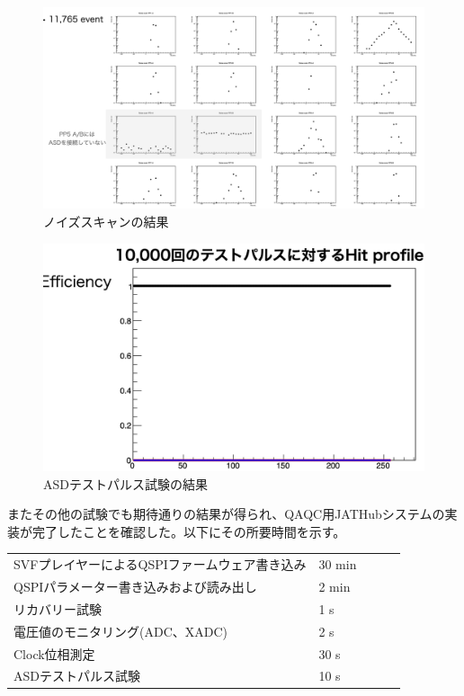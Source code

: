 \begin{figure} 
\centering
\includegraphics[width=16cm]{fig/QAQC/QAQCnoisescan.png}
\caption[ノイズスキャン]{ノイズスキャンの結果}
\label{QAQCnoisescan}
\end{figure}

\begin{figure} 
\centering
\includegraphics[width=16cm]{fig/QAQC/QAQCresult.png}
\caption[ASDテストパルスの結果]{ASDテストパルス試験の結果}
\label{QAQCresult}
\end{figure}

またその他の試験でも期待通りの結果が得られ、QAQC用JATHubシステムの実装が完了したことを確認した。以下にその所要時間を示す。

\begin{table}[]
    \begin{tabular}{lllll}
    SVFプレイヤーによるQSPIファームウェア書き込み    & 30 min &  &  &  \\
    QSPIパラメーター書き込みおよび読み出し         & 2 min  &  &  &  \\
    リカバリー試験                       & 1 s    &  &  &  \\
    電圧値のモニタリング(ADC、XADC) & 2 s    &  &  &  \\
    Clock位相測定                     & 30 s   &  &  &  \\
    ASDテストパルス試験                   & 10 s   &  &  & 
    \end{tabular}
\end{table}

